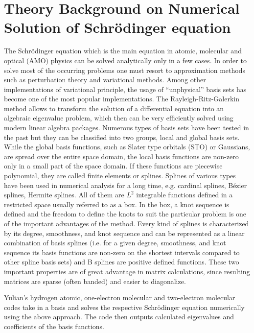 \documentclass [11pt,a4paper]{report}
\begin{document}
\section{Theory Background on Numerical Solution of Schrödinger equation}
\label{sec:theory}
The Schrödinger equation which is the main equation in atomic, molecular and optical (AMO) physics can be solved analytically only in a few cases. In order to solve most of the occurring problems one must resort to approximation methods such as perturbation theory and variational methods. Among other implementations of variational principle, the usage of ``unphysical'' basis sets has become one of the most popular implementations. The Rayleigh-Ritz-Galerkin method allows to transform the solution of a differential equation into an algebraic eigenvalue problem, which then can be very efficiently solved using modern linear algebra packages. Numerous types of basis sets have been tested in the past but they can be classified into two groups, local and global basis sets. While the global basis functions, such as Slater type orbitals (STO) or Gaussians, are spread over the entire space domain, the local basis functions are non-zero only in a small part of the space domain. If these functions are piecewise polynomial, they are called finite elements or splines. Splines of various types have been used in numerical analysis for a long time, e.g. cardinal splines, Bézier splines, Hermite splines. All of them are $L^2$ integrable functions defined in a restricted space usually referred to as a box. In the box, a knot sequence is defined and the freedom to define the knots to suit the particular problem is one of the important advantages of the method. Every kind of splines is characterized by its degree, smoothness, and knot sequence and can be represented as a linear combination of basis splines (i.e. for a given degree, smoothness, and knot sequence its basis functions are non-zero on the shortest intervals compared to other spline basis sets) and B splines are positive defined functions. These two important properties are of great advantage in matrix calculations, since resulting matrices are sparse (often banded) and easier to diagonalize. \cite{YulianThesis}

Yulian's hydrogen atomic, one-electron molecular and two-electron molecular codes take in a basis and solves the respective Schrödinger equation numerically using the above approach. The code then outputs calculated eigenvalues and coefficients of the basis functions.

%
%
\end{document}
